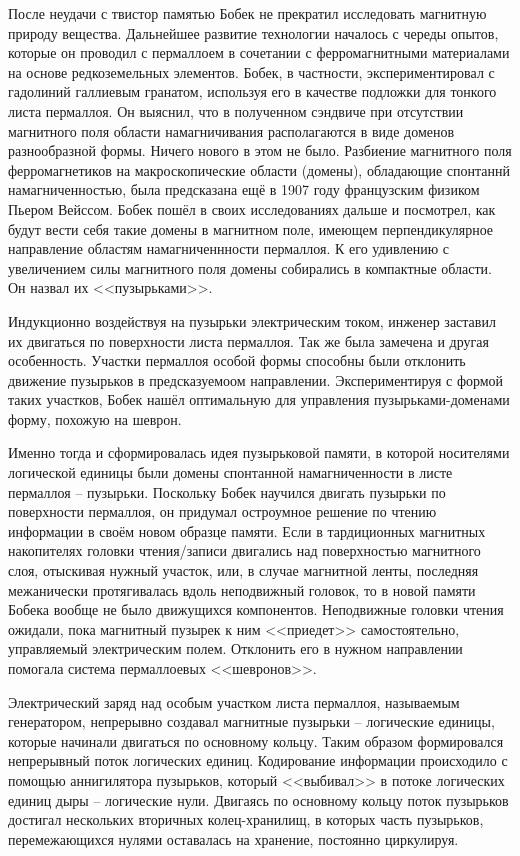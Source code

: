 После неудачи с твистор памятью Бобек не прекратил исследовать 
магнитную природу вещества. Дальнейшее развитие технологии началось с 
череды опытов, которые он проводил с пермаллоем в сочетании с 
ферромагнитными материалами на основе редкоземельных элементов. Бобек, в 
частности, экспериментировал с гадолиний галлиевым гранатом, используя его 
в качестве подложки для тонкого листа пермаллоя. Он выяснил, что в 
полученном сэндвиче при отсутствии магнитного поля области намагничивания 
располагаются в виде доменов разнообразной формы. Ничего нового в этом не 
было. Разбиение магнитного поля ферромагнетиков на макроскопические области 
(домены), обладающие спонтаннй намагниченностью, была предсказана ещё в 
1907 году французским физиком Пьером Вейссом. Бобек пошёл в своих 
исследованиях дальше и посмотрел, как будут вести себя такие домены в 
магнитном поле, имеющем перпендикулярное направление областям 
намагниченнности пермаллоя. К его удивлению с увеличением силы магнитного 
поля домены собирались в компактные области. Он назвал их <<пузырьками>>.

Индукционно воздействуя на пузырьки электрическим током, инженер заставил 
их двигаться по поверхности листа пермаллоя. Так же была замечена и 
другая особенность. Участки пермаллоя особой формы способны были 
отклонить движение пузырьков в предсказуемоом направлении. Экспериментируя 
с формой таких участков, Бобек нашёл оптимальную для управления 
пузырьками-доменами форму, похожую на шеврон.

Именно тогда и сформировалась идея пузырьковой памяти, в которой 
носителями логической единицы были домены спонтанной намагниченности в 
листе пермаллоя -- пузырьки. Поскольку Бобек научился двигать пузырьки по 
поверхности пермаллоя, он придумал остроумное решение по чтению 
информации в своём новом образце памяти. Если в тардиционных магнитных 
накопителях головки чтения/записи двигались над поверхностью магнитного 
слоя, отыскивая нужный участок, или, в случае магнитной ленты, последняя 
межанически протягивалась вдоль неподвижный головок, то в новой памяти 
Бобека вообще не было движущихся компонентов. Неподвижные головки 
чтения ожидали, пока магнитный пузырек к ним <<приедет>> самостоятельно, 
управляемый электрическим полем. Отклонить его в нужном направлении 
помогала система пермаллоевых <<шевронов>>.

Электрический заряд над особым участком листа пермаллоя, называемым 
генератором, непрерывно создавал магнитные пузырьки -- логические 
единицы, которые начинали двигаться по основному кольцу. Таким образом 
формировался непрерывный поток логических единиц. Кодирование информации 
происходило с помощью аннигилятора пузырьков, который <<выбивал>> в 
потоке логических единиц дыры -- логические нули. Двигаясь по основному 
кольцу поток пузырьков достигал нескольких вторичных колец-хранилищ, в 
которых часть пузырьков, перемежающихся нулями оставалась на хранение, 
постоянно циркулируя.

